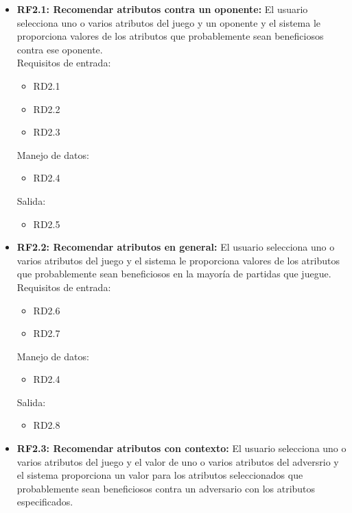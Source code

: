 	\begin{itemize}
		\item \textbf{RF2.1: Recomendar atributos contra un oponente:}
			El usuario selecciona uno o varios atributos del juego y un
			oponente y el sistema le proporciona valores de los
			atributos que probablemente sean beneficiosos contra ese oponente.\\

			Requisitos de entrada:
			\begin{itemize}
				\item RD2.1 %
				\item RD2.2 %
				\item RD2.3 %
			\end{itemize}
			Manejo de datos:
			\begin{itemize}
				\item RD2.4 %
			\end{itemize}
			Salida:
			\begin{itemize}
				\item RD2.5 %
			\end{itemize}

		\item \textbf{RF2.2: Recomendar atributos en general:}
			El usuario selecciona uno o varios atributos del juego
			y el sistema le proporciona valores de los atributos
			que probablemente sean beneficiosos en la mayoría
			de partidas que juegue.\\

			Requisitos de entrada:
			\begin{itemize}
				\item RD2.6 %
				\item RD2.7 %
			\end{itemize}
			Manejo de datos:
			\begin{itemize}
				\item RD2.4 %
			\end{itemize}
			Salida:
			\begin{itemize}
				\item RD2.8 %
			\end{itemize}

		\item \textbf{RF2.3: Recomendar atributos con contexto:}
			El usuario selecciona uno o varios atributos del juego y
			el valor de uno o varios atributos del adversrio y el sistema
			proporciona un valor para los atributos seleccionados que
			probablemente sean beneficiosos contra un adversario con
			los atributos especificados.\\


\end{itemize}
